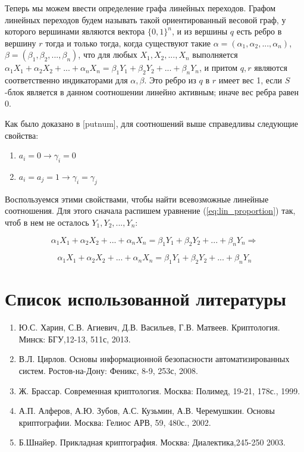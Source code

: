 \documentclass[a4paper,12pt]{extarticle}
\begin{document}
\begin{large}
Теперь мы можем ввести определение графа линейных переходов. Графом линейных переходов будем называть такой ориентированный весовой граф, у которого вершинами являются вектора $\{0, 1\}^n$, и из вершины $q$ есть ребро в вершину $r$ тогда и только тогда, когда существуют такие $\alpha = (\alpha_1, \alpha_2, ..., \alpha_n)$, $\beta = (\beta_1, \beta_2, ..., \beta_n)$, что для любых $X_1, X_2, ..., X_n$ выполняется $\alpha_1X_1 + \alpha_2X_2 + ... + \alpha_nX_n = \beta_1Y_1 + \beta_2Y_2 + ... + \beta_nY_n$, и притом $q, r$ являются соответственно индикаторами для $\alpha, \beta$. Это ребро из $q$ в $r$ имеет вес 1, если $S$-блок является в данном соотношении линейно активным; иначе вес ребра равен 0.

Как было доказано в [putnum], для соотношений выше справедливы следующие свойства:

\begin{enumerate}
\item $a_i = 0 \rightarrow \gamma_i = 0$
\item $a_i = a_j = 1 \rightarrow \gamma_i = \gamma_j$
\end{enumerate}

Воспользуемся этими свойствами, чтобы найти всевозможные линейные соотношения. Для этого сначала распишем уравнение (\ref{eq:lin_proportion}) так, чтоб в нем не осталось $Y_1, Y_2, ..., Y_n$:

$$\alpha_1X_1 + \alpha_2X_2 + ... + \alpha_nX_n = \beta_1Y_1 + \beta_2Y_2 + ... + \beta_nY_n \Rightarrow$$

$$\alpha_1X_1 + \alpha_2X_2 + ... + \alpha_nX_n = \beta_1Y_1 + \beta_2Y_2 + ... + \beta_nY_n$$

\newpage
\section*{Список использованной литературы}
\vspace*{1cm}

\begin{enumerate}
\item Ю.С. Харин, С.В. Агиевич, Д.В. Васильев, Г.В. Матвеев. Криптология.  Минск: БГУ,12-13, 511с, 2013.
\item В.Л. Цирлов. Основы информационной безопасности автоматизированных систем. Ростов-на-Дону: Феникс, 8-9, 253с, 2008.
\item Ж. Брассар. Современная криптология. Москва: Полимед, 19-21, 178с., 1999.
\item А.П. Алферов, А.Ю. Зубов, А.С. Кузьмин, А.В. Черемушкин. Основы криптографии. Москва: Гелиос АРВ, 59, 480с., 2002.
\item Б.Шнайер. Прикладная криптография. Москва: Диалектика,245-250 2003.
\end{enumerate}

\end{large}
\end{document}
